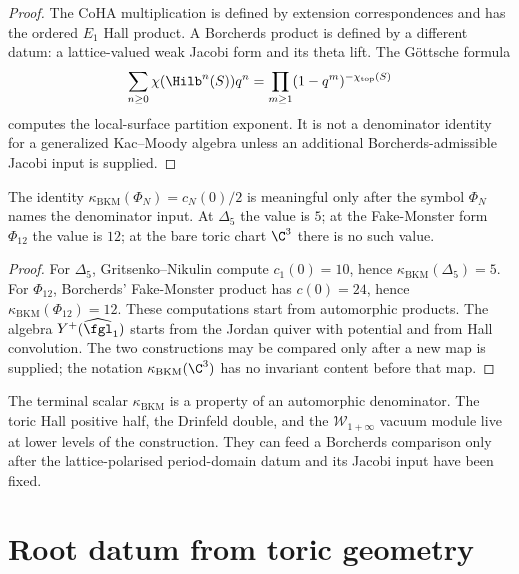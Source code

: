 \begin{proof}
The CoHA multiplication is defined by extension correspondences and has the ordered $E_1$ Hall product. A Borcherds product is defined by a different datum: a lattice-valued weak Jacobi form and its theta lift. The G\"ottsche formula
\[
 \sum_{n\ge0}\chi(\Hilb^n(S))q^n
 =\prod_{m\ge1}(1-q^m)^{-\chi_{\mathrm{top}}(S)}
\]
computes the local-surface partition exponent. It is not a denominator identity for a generalized Kac--Moody algebra unless an additional Borcherds-admissible Jacobi input is supplied.
\end{proof}

\begin{proposition}
\label{prop:bl-cross-path-consistency-c3}
The identity $\kappa_{\mathrm{BKM}}(\Phi_N)=c_N(0)/2$ is meaningful only after the symbol $\Phi_N$ names the denominator input. At $\Delta_5$ the value is $5$; at the Fake-Monster form $\Phi_{12}$ the value is $12$; at the bare toric chart $\C^3$ there is no such value.
\end{proposition}

\begin{proof}
For $\Delta_5$, Gritsenko--Nikulin compute $c_1(0)=10$, hence $\kappa_{\mathrm{BKM}}(\Delta_5)=5$. For $\Phi_{12}$, Borcherds' Fake-Monster product has $c(0)=24$, hence $\kappa_{\mathrm{BKM}}(\Phi_{12})=12$. These computations start from automorphic products. The algebra $Y^+(\widehat{\fgl}_1)$ starts from the Jordan quiver with potential and from Hall convolution. The two constructions may be compared only after a new map is supplied; the notation $\kappa_{\mathrm{BKM}}(\C^3)$ has no invariant content before that map.
\end{proof}

\begin{remark}
\label{rem:bl-base-case-anchor}
The terminal scalar $\kappa_{\mathrm{BKM}}$ is a property of an automorphic denominator. The toric Hall positive half, the Drinfeld double, and the $\mathcal W_{1+\infty}$ vacuum module live at lower levels of the construction. They can feed a Borcherds comparison only after the lattice-polarised period-domain datum and its Jacobi input have been fixed.
\end{remark}

\section{Root datum from toric geometry}
\label{sec:toric-root-datum}


